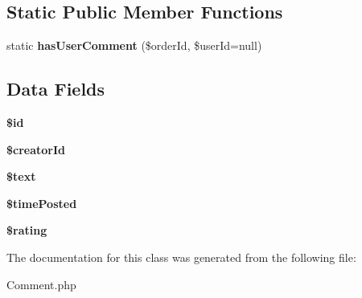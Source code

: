 \subsection*{Static Public Member Functions}
\begin{DoxyCompactItemize}
\item 
\hypertarget{classapp_1_1models_1_1_comment_a44672f6fe5c05d1a152e44b3843365ce}{}\label{classapp_1_1models_1_1_comment_a44672f6fe5c05d1a152e44b3843365ce} 
static {\bfseries has\+User\+Comment} (\$order\+Id, \$user\+Id=null)
\end{DoxyCompactItemize}
\subsection*{Data Fields}
\begin{DoxyCompactItemize}
\item 
\hypertarget{classapp_1_1models_1_1_comment_ae97941710d863131c700f069b109991e}{}\label{classapp_1_1models_1_1_comment_ae97941710d863131c700f069b109991e} 
{\bfseries \$id}
\item 
\hypertarget{classapp_1_1models_1_1_comment_ad0834b3f78c37216b0ba8d6b598364b2}{}\label{classapp_1_1models_1_1_comment_ad0834b3f78c37216b0ba8d6b598364b2} 
{\bfseries \$creator\+Id}
\item 
\hypertarget{classapp_1_1models_1_1_comment_adf95f30eaafccead90ab5e2cdb55e9b9}{}\label{classapp_1_1models_1_1_comment_adf95f30eaafccead90ab5e2cdb55e9b9} 
{\bfseries \$text}
\item 
\hypertarget{classapp_1_1models_1_1_comment_a01cea456eabd700254653d5b8dcaba9d}{}\label{classapp_1_1models_1_1_comment_a01cea456eabd700254653d5b8dcaba9d} 
{\bfseries \$time\+Posted}
\item 
\hypertarget{classapp_1_1models_1_1_comment_a44118acf7e954a3bc096a4af6b059c23}{}\label{classapp_1_1models_1_1_comment_a44118acf7e954a3bc096a4af6b059c23} 
{\bfseries \$rating}
\end{DoxyCompactItemize}


The documentation for this class was generated from the following file\+:\begin{DoxyCompactItemize}
\item 
Comment.\+php\end{DoxyCompactItemize}
